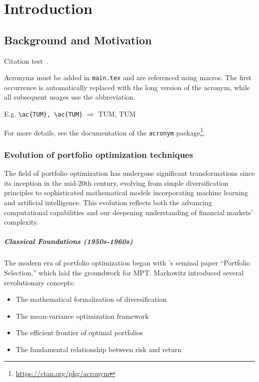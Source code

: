 
\chapter{Introduction}\label{chapter:introduction}

\section{Background and Motivation}
Citation test~\parencite{latex}.

Acronyms must be added in \texttt{main.tex} and are referenced using macros. The first occurrence is automatically replaced with the long version of the acronym, while all subsequent usages use the abbreviation.

E.g. \texttt{\textbackslash ac\{TUM\}, \textbackslash ac\{TUM\}} $\Rightarrow$ \ac{TUM}, \ac{TUM}

For more details, see the documentation of the \texttt{acronym} package\footnote{\url{https://ctan.org/pkg/acronym}}.


\subsection{Evolution of portfolio optimization techniques}
The field of portfolio optimization has undergone significant transformations since its inception in the mid-20th century, evolving from simple diversification principles to sophisticated mathematical models incorporating machine learning and artificial intelligence. 
This evolution reflects both the advancing computational capabilities and our deepening understanding of financial markets' complexity.


\paragraph{Classical Foundations (1950s-1960s)}
The modern era of portfolio optimization began with \parencite{markowitz1952portfolio}'s seminal paper ``Portfolio Selection,'' which laid the groundwork for \ac{MPT}. Markowitz introduced several revolutionary concepts:

\begin{itemize}
    \item The mathematical formalization of diversification
    \item The mean-variance optimization framework
    \item The efficient frontier of optimal portfolios
    \item The fundamental relationship between risk and return
\end{itemize}

